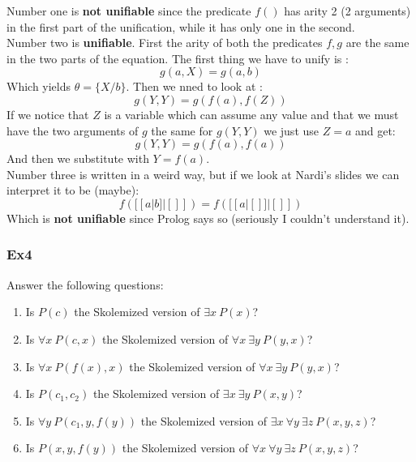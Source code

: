 \documentclass[10pt,a4paper]{article}
\begin{document}
\begin{itemize}
Number one is \textbf{not unifiable} since the predicate $f()$ has arity 2 (2 arguments) in the first part of the unification, while it has only one in the second.\\

Number two is \textbf{unifiable}. First the arity of both the predicates $f,g$ are the same in the two parts of the equation. The first thing we have to unify is :
\[g(a,X)=g(a,b)\]
Which yields $\theta=\lbrace X/b \rbrace$. Then we nned to look at :
\[g(Y,Y)=g(f(a),f(Z))\]
If we notice that $Z$ is a variable which can assume any value and that we must have the two arguments of $g$ the same for $g(Y,Y)$ we just use $Z=a$ and get:
\[g(Y,Y)=g(f(a),f(a))\]
And then we substitute with $Y=f(a)$.\\

Number three is written in a weird way, but if we look at Nardi's slides we can interpret it to be (maybe):
\[ f([[a|b]|[]])=f([[a|[]]|[]]) \]
Which is \textbf{not unifiable} since Prolog says so (seriously I couldn't understand it).


\subsubsection{Ex4}
Answer the following questions:
\begin{enumerate}
\item  Is $P(c)$ the Skolemized version of $\exists x\ P(x)$?
\item  Is $\forall x\ P(c,x)$ the Skolemized version of $\forall x\ \exists y\ P(y,x)$?
\item  Is $\forall x\ P(f(x),x)$ the Skolemized version of $\forall x\ \exists y\ P(y,x)$?
\item  Is $P(c_1,c_2)$ the Skolemized version of $\exists x\ \exists y\ P(x,y)$?
\item  Is $\forall y\ P(c_1,y,f(y))$ the Skolemized version of $\exists x\ \forall y\ \exists z\ P(x,y,z)$?
\item  Is $P(x,y,f(y))$ the Skolemized version of $\forall x\ \forall y\ \exists z\ P(x,y,z)$?
\end{enumerate}


\end{itemize}
\end{document}
